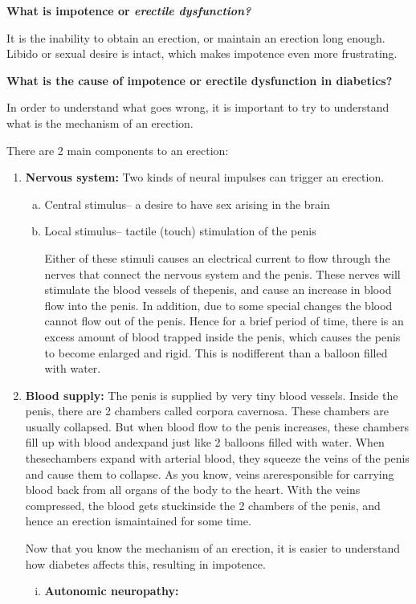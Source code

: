 \noindent\textbf{What is impotence or \textit{erectile dysfunction?}}

It is the inability to obtain an erection, or maintain an erection long enough. Libido or sexual desire is intact, which makes impotence even more frustrating.

\noindent\textbf{What is the cause of impotence or erectile dysfunction in dia\-betics?}

In order to understand what goes wrong, it is important to try to understand what is the mechanism of an erection.

\noindent There are 2 main components to an erection:
\begin{enumerate}
\itemsep=0pt
\item \textbf{Nervous system:} Two kinds of neural impulses can trigger an erection.
\begin{enumerate}[a)]
\itemsep=0pt
\item Central stimulus– a desire to have sex arising in the brain
\item Local stimulus– tactile (touch) stimulation of the penis

Either of these stimuli causes an electrical current to flow through the nerves that connect the nervous system and the penis. These nerves will stimulate the blood vessels of the\break penis, and cause an increase in blood flow into the penis. In addition, due to some special changes the blood cannot flow out of the penis. Hence for a brief period of time, there is an excess amount of blood trapped inside the penis, which causes the penis to become enlarged and rigid. This is no\break different than a balloon filled with water.
\end{enumerate}
\item \textbf{Blood supply:} The penis is supplied by very tiny blood vessels. Inside the penis, there are 2 chambers called corpora cavernosa. These chambers are usually collapsed. But when blood flow to the penis increases, these chambers fill up with blood and\break expand just like 2 balloons filled with water. When these\break chambers expand with arterial blood, they squeeze the veins of the penis and cause them to collapse. As you know, veins are\break responsible for carrying blood back from all organs of the body to the heart. With the veins compressed, the blood gets stuck\break inside the 2 chambers of the penis, and hence an erection is\break maintained for some time.

Now that you know the mechanism of an erection, it is easier to understand how diabetes affects this, resulting in impotence.
\begin{enumerate}[i.]
\itemsep=0pt
 \item \textbf{Autonomic neuropathy:}


\end{enumerate}
\end{enumerate}

